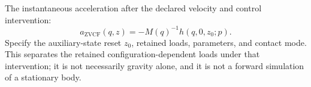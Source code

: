 \begin{description}[style=nextline,leftmargin=0pt,font=\bfseries,itemsep=0.5em]
\item[Zero-Velocity Counterfactual (ZVCF)]
The instantaneous acceleration after the declared velocity and control intervention:
\begin{equation*}
a_{\mathrm{ZVCF}}(q,z)=-M(q)^{-1}h(q,0,z_0;p) .
\end{equation*}
Specify the auxiliary-state reset $z_0$, retained loads, parameters, and contact mode. This separates the retained configuration-dependent loads under that intervention; it is not necessarily gravity alone, and it is not a forward simulation of a stationary body.
\end{description}
